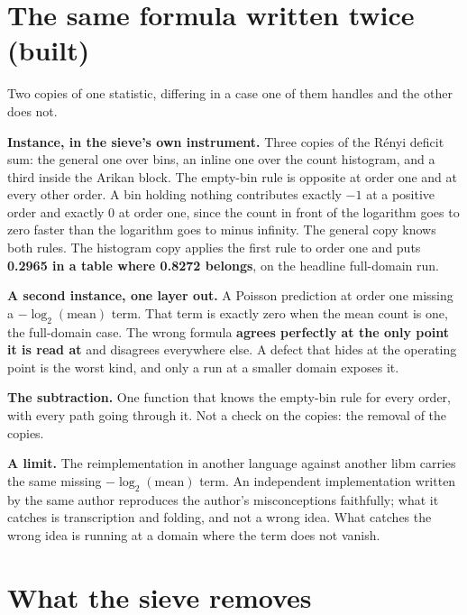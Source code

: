 \section{The same formula written twice (built)}

Two copies of one statistic, differing in a case one of them handles and the other does not.

\textbf{Instance, in the sieve's own instrument.} Three copies of the Rényi deficit sum: the general one over bins, an inline one over the count histogram, and a third inside the Arikan block. The empty-bin rule is opposite at order one and at every other order. A bin holding nothing contributes exactly \(-1\) at a positive order and exactly \(0\) at order one, since the count in front of the logarithm goes to zero faster than the logarithm goes to minus infinity. The general copy knows both rules. The histogram copy applies the first rule to order one and puts \textbf{0.2965 in a table where 0.8272 belongs}, on the headline full-domain run.

\textbf{A second instance, one layer out.} A Poisson prediction at order one missing a \(-\log_2(\mathrm{mean})\) term. That term is exactly zero when the mean count is one, the full-domain case. The wrong formula \textbf{agrees perfectly at the only point it is read at} and disagrees everywhere else. A defect that hides at the operating point is the worst kind, and only a run at a smaller domain exposes it.

\textbf{The subtraction.} One function that knows the empty-bin rule for every order, with every path going through it. Not a check on the copies: the removal of the copies.

\textbf{A limit.} The reimplementation in another language against another libm carries the same missing \(-\log_2(\mathrm{mean})\) term. An independent implementation written by the same author reproduces the author's misconceptions faithfully; what it catches is transcription and folding, and not a wrong idea. What catches the wrong idea is running at a domain where the term does not vanish.

\section{What the sieve removes}

